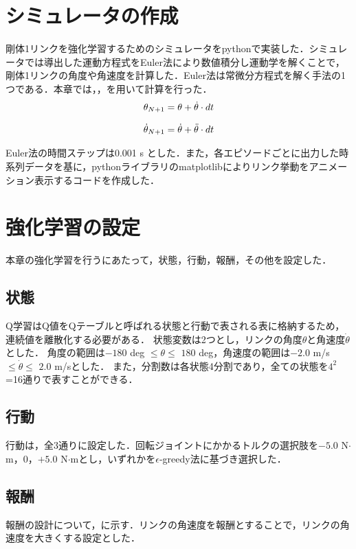 \section{シミュレータの作成}
剛体1リンクを強化学習するためのシミュレータをpythonで実装した．シミュレータでは導出した運動方程式をEuler法\cite{euler}により数値積分し運動学を解くことで，剛体1リンクの角度や角速度を計算した．Euler法は常微分方程式を解く手法の1つである．本章では，，を用いて計算を行った．\\

\begin{eqnarray}
  \equlabel{3.13}
  \theta_{N + 1} = \theta + \dot{\theta} \cdot dt
\end{eqnarray}

\begin{eqnarray}
  \equlabel{3.14}
  \dot{\theta}_{N + 1} = \dot{\theta} + \ddot{\theta} \cdot dt
\end{eqnarray}

Euler法の時間ステップは0.001 s とした．また，各エピソードごとに出力した時系列データを基に，pythonライブラリのmatplotlibによりリンク挙動をアニメーション表示するコードを作成した．
\section{強化学習の設定}
本章の強化学習を行うにあたって，状態，行動，報酬，その他を設定した．
\subsection{状態}
Q学習はQ値をQテーブルと呼ばれる状態と行動で表される表に格納するため，連続値を離散化する必要がある．
状態変数は2つとし，リンクの角度$\theta$と角速度$\dot{\theta}$とした．
角度の範囲は$-180$ deg $\leq \theta \leq$ $180$ deg，角速度の範囲は$-2.0$ m/s $\leq \dot{\theta} \leq$ $2.0$ m/sとした．
また，分割数は各状態4分割であり，全ての状態を$4^{2}$=16通りで表すことができる．
\subsection{行動}
行動は，全3通りに設定した．回転ジョイントにかかるトルクの選択肢を$-5.0$ N$\cdot$m，$0$，$+5.0$ N$\cdot$mとし，いずれかを$\epsilon$-greedy法に基づき選択した．
\subsection{報酬}
報酬の設計について，に示す．リンクの角速度を報酬とすることで，リンクの角速度を大きくする設定とした．

